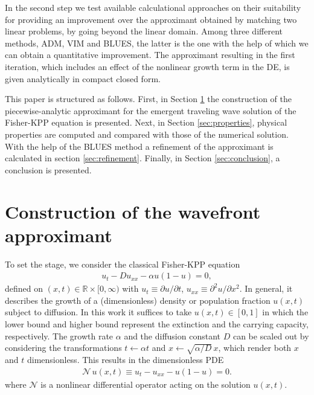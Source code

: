 \documentclass[amsmath,amssymb,amsfonts,aps,pre,preprint,superscriptaddress,showpacs,showkeys,longbibliography,nofootinbib]{revtex4-1}
\newcommand*{\nlop}{\mathcal{N}\,}
\begin{document}
In the second step we test available calculational approaches on their suitability for providing an improvement over the approximant obtained by matching two linear problems, by going beyond the linear domain. Among three different methods, ADM, VIM and BLUES, the latter is the one with the help of which we can obtain a quantitative improvement. The approximant  resulting in the first iteration, which includes an effect of the nonlinear growth term in the DE, is given analytically in compact closed form.  

This paper is structured as follows. First, in Section \ref{sec:constructing_approximant} the construction of the piecewise-analytic approximant for the emergent traveling wave solution of the Fisher-KPP equation is presented. Next, in Section \ref{sec:properties}, physical properties are computed and compared with those of the numerical solution. With the help of the BLUES method a refinement of the approximant is calculated in section \ref{sec:refinement}. Finally, in Section \ref{sec:conclusion}, a conclusion is presented.

\section{Construction of the wavefront approximant}\label{sec:constructing_approximant}

To set the stage, we consider the classical Fisher-KPP equation
\begin{align}\label{eq:dimensionfull_Fisher}
    u_t - Du_{xx} - \alpha u(1-u)=0,
\end{align}
defined on $(x,t) \in \mathbb{R} \times [0,\infty)$ with $u_t\equiv\partial u / \partial t$,  $u_{xx}\equiv\partial^2 u / \partial x^2$.  In general, it describes the growth of a (dimensionless) density or population fraction $u(x,t)$ subject to diffusion. In this work it suffices to take $u(x,t)\in[0,1]$ in which the lower bound and higher bound represent the extinction and the carrying capacity, respectively. The growth rate $\alpha$ and the diffusion constant $D$ can be scaled out by considering the transformations $t\gets \alpha t$ and $x\gets \sqrt{\alpha/D}\,x$, which render both $x$ and $t$ dimensionless. This results in the dimensionless PDE
\begin{align}\label{eq:dimensionless_Fisher}
    \nlop u(x,t)\equiv u_t - u_{xx} - u(1-u)=0.
\end{align}
where $\mathcal{N}$ is a nonlinear differential operator acting on the solution $u(x,t)$.
\end{document}
